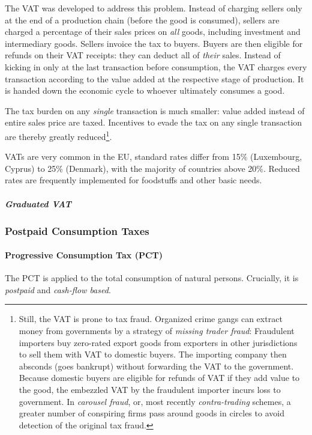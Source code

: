 The VAT was developed to address this problem. Instead of charging sellers only at the end of a production chain (before the good is consumed), sellers are charged a percentage of their sales prices on \emph{all} goods, including investment and intermediary goods. Sellers invoice the tax to buyers. Buyers are then eligible for refunds on their VAT receipts: they can deduct all of \emph{their} sales. Instead of kicking in only at the last transaction before consumption, the VAT charges every transaction according to the value added at the respective stage of production. It is handed down the economic cycle to whoever ultimately consumes a good.

The tax burden on any \emph{single} transaction is much smaller: value added instead of entire sales price are taxed. Incentives to evade the tax on any single transaction are thereby greatly reduced\footnote{Still, the VAT is prone to tax fraud. Organized crime gangs can extract money from governments by a strategy of \emph{missing trader fraud}: Fraudulent importers buy zero-rated export goods from exporters in other jurisdictions to sell them with VAT to domestic buyers. The importing company then absconds (goes bankrupt) without forwarding the VAT to the government. Because domestic buyers are eligible for refunds of VAT if they add value to the good, the embezzled VAT by the fraudulent importer incurs loss to government. In \emph{carousel fraud}, or, most recently \emph{contra-trading} schemes, a greater number of conspiring firms pass around goods in circles to avoid detection of the original tax fraud.}.

VATs are very common in the EU, standard rates differ from 15\% (Luxembourg, Cyprus) to 25\% (Denmark), with the majority of countries above 20\%. Reduced rates are frequently implemented for foodstuffs and other basic needs.

\subparagraph{Graduated VAT}

\subsubsection{Postpaid Consumption Taxes}

\paragraph{Progressive Consumption Tax (PCT)} \label{sec:PCT}  The \gls{PCT} is applied to the total consumption of natural persons. Crucially, it is \emph{postpaid} and \emph{cash-flow based}.

